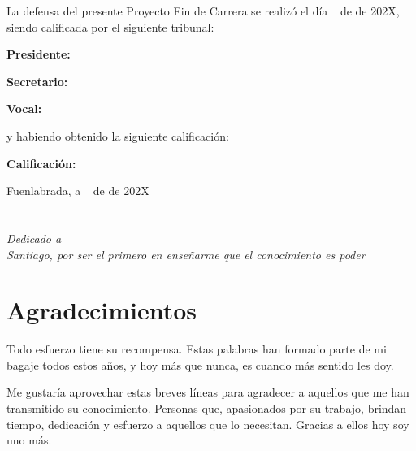 \documentclass[a4paper, 12pt]{book}
\begin{document}
\vspace{1cm}
La defensa del presente Proyecto Fin de Carrera se realizó el día \qquad$\;\,$ de \qquad\qquad\qquad\qquad \newline de 202X, siendo calificada por el siguiente tribunal:


\vspace{0.5cm}
\textbf{Presidente:}

\vspace{1.2cm}
\textbf{Secretario:}

\vspace{1.2cm}
\textbf{Vocal:}


\vspace{1.2cm}
y habiendo obtenido la siguiente calificación:

\vspace{1cm}
\textbf{Calificación:}


\vspace{1cm}
\begin{flushright}
Fuenlabrada, a \qquad$\;\,$ de \qquad\qquad\qquad\qquad de 202X
\end{flushright}


\chapter*{}
\begin{flushright}
\textit{Dedicado a \\
Santiago, por ser el primero en
enseñarme que el conocimiento es poder}
\end{flushright}


\chapter*{Agradecimientos}

Todo esfuerzo tiene su recompensa. Estas palabras han formado parte de
mi bagaje todos estos años, y hoy más que nunca, es cuando más sentido
les doy.

Me gustaría aprovechar estas breves líneas para agradecer a aquellos que
me han transmitido su conocimiento. Personas que, apasionados por su
trabajo, brindan tiempo, dedicación y esfuerzo a aquellos que lo necesitan.
Gracias a ellos hoy soy uno más.
\end{document}
